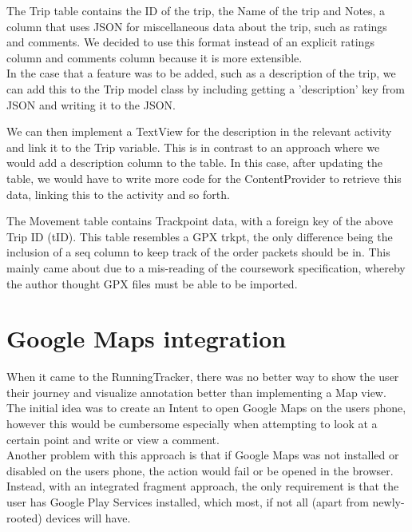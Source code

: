 \documentclass[11pt]{article}
\begin{document}
The Trip table contains the ID of the trip, the Name of the trip and Notes, a column that uses JSON for miscellaneous data about the trip, such as ratings and comments. We decided to use this format instead of an explicit ratings column and comments column because it is more extensible. \\
In the case that a feature was to be added, such as a description of the trip, we can add this to the Trip model class by including getting a 'description' key from JSON and writing it to the JSON. 

We can then implement a TextView for the description in the relevant activity and link it to the Trip variable. This is in contrast to an approach where we would add a description column to the table. In this case, after updating the table, we would have to write more code for the ContentProvider to retrieve this data, linking this to the activity and so forth.


The Movement table contains Trackpoint data, with a foreign key of the above Trip ID (tID). This table resembles a GPX trkpt, the only difference being the inclusion of a seq column to keep track of the order packets should be in. This mainly came about due to a mis-reading of the coursework specification, whereby the author thought GPX files must be able to be imported.

\newpage


\section{Google Maps integration}
When it came to the RunningTracker, there was no better way to show the user their journey and visualize annotation better than implementing a Map view. \\

The initial idea was to create an Intent to open Google Maps on the users phone, however this would be cumbersome especially when attempting to look at a certain point and write or view a comment.\\


Another problem with this approach is that if Google Maps was not installed or disabled on the users phone, the action would fail or be opened in the browser. Instead, with an integrated fragment approach, the only requirement is that the user has Google Play Services installed, which most, if not all (apart from newly-rooted) devices will have.\\
\end{document}
